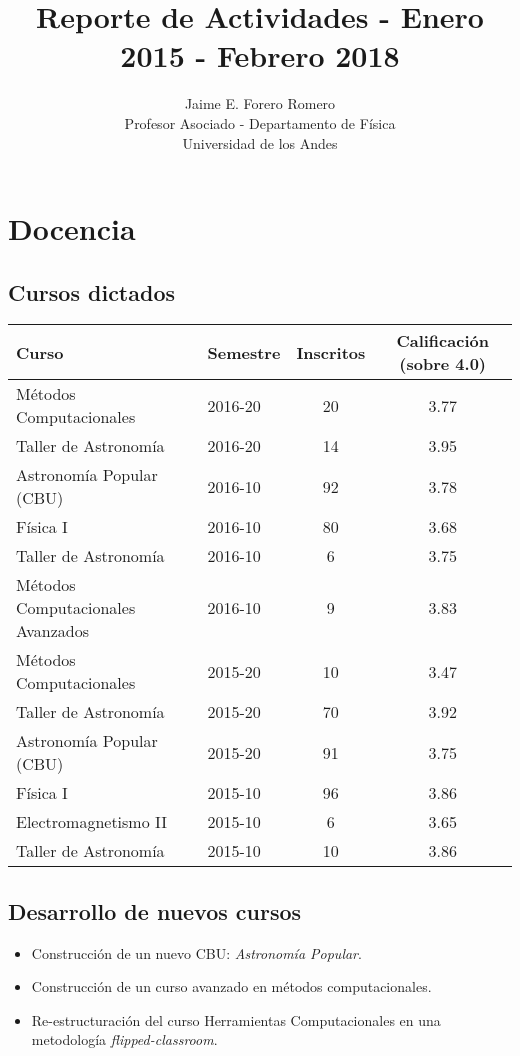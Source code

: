 \documentclass{article}
\title{Reporte de Actividades - Enero 2015 - Febrero 2018}
\author{Jaime E. Forero Romero\\Profesor Asociado - Departamento de
  F\'isica\\Universidad de los Andes}
\begin{document}
\maketitle
\tableofcontents
\newpage

\section{Docencia}

\subsection{Cursos dictados}
\begin{tabular}{p{6.0cm} l c c}\hline
Curso & Semestre & Inscritos & Calificaci\'on (sobre
4.0)\\\hline
M\'etodos Computacionales & 2016-20 & 20 & 3.77\\
Taller de Astronom\'ia & 2016-20 & 14 & 3.95\\
Astronom\'ia Popular (CBU) & 2016-10 & 92 & 3.78\\\hline
F\'isica I & 2016-10 & 80 & 3.68\\
Taller de Astronom\'ia & 2016-10 & 6 & 3.75\\
M\'etodos Computacionales Avanzados & 2016-10 & 9 & 3.83\\\hline
M\'etodos Computacionales & 2015-20 & 10 & 3.47\\
Taller de Astronom\'ia & 2015-20 & 70 & 3.92\\
Astronom\'ia Popular (CBU) & 2015-20 & 91 & 3.75\\ \hline
F\'isica I & 2015-10 & 96 & 3.86\\
Electromagnetismo II & 2015-10 & 6 & 3.65 \\
Taller de Astronom\'ia & 2015-10 & 10 & 3.86\\\hline
\end{tabular}

\subsection{Desarrollo de nuevos cursos}
\begin{itemize}
\item Construcci\'on de un nuevo CBU: \emph{Astronom\'ia Popular}.
\item Construcci\'on de un curso avanzado en m\'etodos computacionales.
\item Re-estructuraci\'on del curso Herramientas Computacionales en
  una metodolog\'ia \emph{flipped-classroom}.
\end{itemize}
\end{document}
